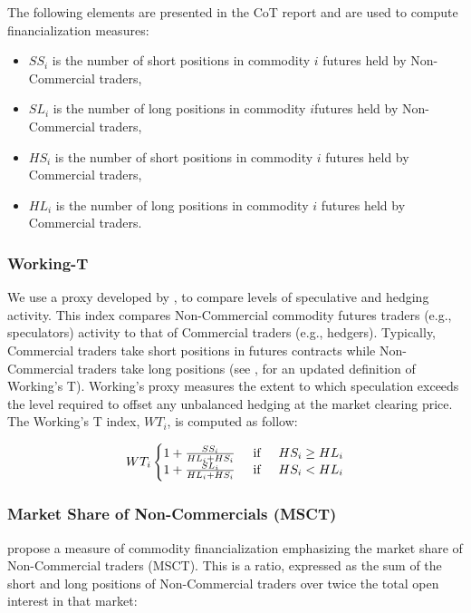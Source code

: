 \documentclass[12pt]{article}
\begin{document}
The following elements are presented in the CoT report and are used to compute financialization measures:

\begin{itemize}
\item $SS_i$ is the number of short positions in commodity $i$ futures held by Non-Commercial traders,
\item $SL_i$  is the number of long positions in commodity $i$futures held by Non-Commercial traders,
\item $HS_i$ is the number of short positions in commodity $i$ futures held by Commercial traders, 
\item $HL_i$ is the number of long positions in commodity $i$ futures held by Commercial traders.
\end{itemize}

\subsubsection{Working-T}
We use a proxy developed by \citet{working1960speculation}, to compare levels of speculative and hedging activity. This index compares Non-Commercial commodity futures traders (e.g., speculators) activity to that of Commercial traders (e.g., hedgers). Typically, Commercial traders take short positions in futures contracts while Non-Commercial traders take long positions (see \citet{shanker2017new}, for an updated definition of Working’s T). Working’s proxy measures the extent to which speculation exceeds the level required to offset any unbalanced hedging at the market clearing price. The Working's T index, $WT_i$, is computed as follow:


\begin{equation} \label{eqn:Working}
WT_i\left\{\begin{matrix}
 1+\frac{SS_i}{HL_i+HS_i} \hspace{0.5cm} \mbox{if} \hspace{0.5cm} HS_i \ge HL_i\\
1+\frac{SL_i}{HL_i+HS_i} \hspace{0.5cm} \mbox{if} \hspace{0.5cm} HS_i < HL_i
\end{matrix}\right.
\end{equation}


\subsubsection{Market Share of Non-Commercials (MSCT)}
\citet{buyukcsahin2014speculators} propose a measure of commodity financialization emphasizing the market share of Non-Commercial traders (MSCT). This  is a ratio, expressed as  the sum of the short and long positions of Non-Commercial traders over twice the total open interest in that market: 
\end{document}
